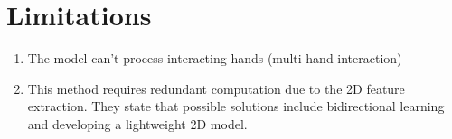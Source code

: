 \documentclass{article}
\begin{document}
\begin{center}
\end{center}

\section*{Limitations}

\begin{enumerate}
    \item The model can't process interacting hands (multi-hand interaction)
    \item This method requires redundant computation due to the 2D feature extraction. They state that possible solutions include bidirectional learning and developing a lightweight 2D model.
\end{enumerate}
\end{document}
